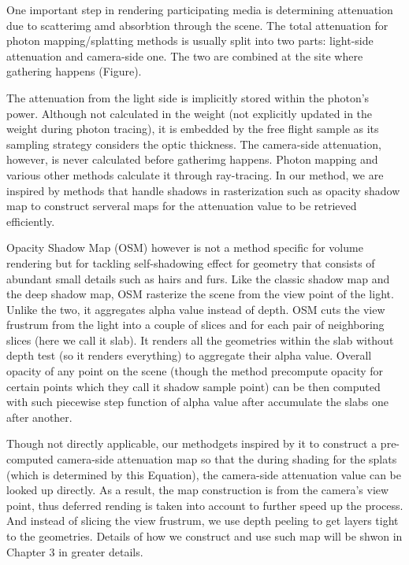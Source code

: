 One important step in rendering participating media is determining attenuation due to scatterimg amd absorbtion through the scene. The total attenuation for photon mapping/splatting methods is usually split into two parts: light-side attenuation and camera-side one. The two are combined at the site where gathering happens (Figure). 

The attenuation from the light side is implicitly stored within the photon's power. Although not calculated in the weight (not explicitly updated in the weight during photon tracing), it is embedded by the free flight sample as its sampling strategy considers the optic thickness. The camera-side attenuation, however, is never calculated before gatherimg happens. Photon mapping and various other methods calculate it through ray-tracing. In our method, we are inspired by methods that handle shadows in rasterization such as opacity shadow map to construct serveral maps for the attenuation value to be retrieved efficiently. 

Opacity Shadow Map (OSM) however is not a method specific for volume rendering but for tackling self-shadowing effect for geometry that consists of abundant small details such as hairs and furs. Like the classic shadow map and the deep shadow map, OSM rasterize the scene from the view point of the light. Unlike the two, it aggregates alpha value instead of depth. OSM cuts the view frustrum from the light into a couple of slices and for each pair of neighboring slices (here we call it slab). It renders all the geometries within the slab without depth test (so it renders everything) to aggregate their alpha value. Overall opacity of any point on the scene (though the method precompute opacity for certain points which they call it shadow sample point) can be then computed with such piecewise step function of alpha value after accumulate the slabs one after another. 

Though not directly applicable, our methodgets inspired by it to construct a pre-computed camera-side attenuation map so that the during shading for the splats (which is determined by this Equation), the camera-side attenuation value can be looked up directly. As a result, the map construction is from the camera's view point, thus deferred rending is taken into account to further speed up the process. And instead of slicing the view frustrum, we use depth peeling to get layers tight to the geometries. Details of how we construct and use such map will be shwon in Chapter 3 in greater details.
